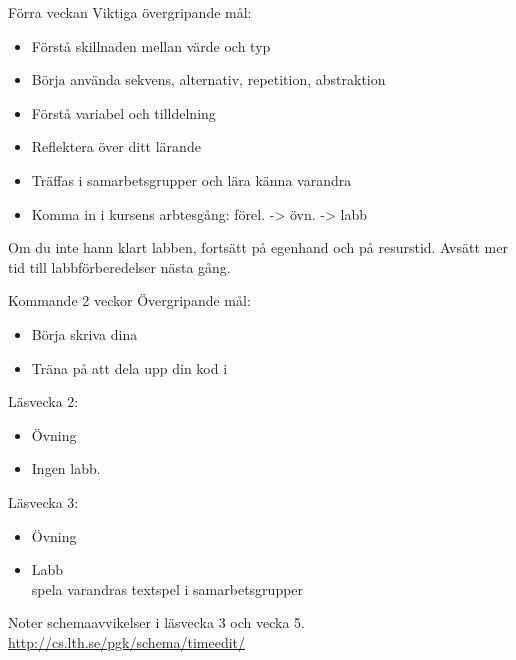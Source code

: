 

\begin{Slide}{Förra veckan}
Viktiga övergripande mål:
\begin{itemize}
\item Förstå skillnaden mellan värde och typ
\item Börja använda sekvens, alternativ, repetition, abstraktion
\item Förstå variabel och tilldelning
\item Reflektera över ditt lärande
\item Träffas i samarbetsgrupper och lära känna varandra
\item Komma in i kursens arbtesgång: förel. -> övn. -> labb
\end{itemize}
Om du inte hann klart labben, fortsätt på egenhand och på resurstid. Avsätt mer tid till labbförberedelser nästa gång.
\end{Slide}


\begin{Slide}{Kommande 2 veckor}
Övergripande mål:
\begin{itemize}
\item Börja skriva dina 
\item Träna på att dela upp din kod i 
\end{itemize}

Läsvecka 2:
\begin{itemize}
\item Övning \texttt{\ExeWeekTWO}
\item Ingen labb.
\end{itemize}
Läsvecka 3:
\begin{itemize}
\item Övning \texttt{\ExeWeekTHREE}
\item Labb \texttt{\LabWeekTHREE}  \\ spela varandras textspel i samarbetsgrupper
\end{itemize}

\vspace{1em} Noter schemaavvikelser i läsvecka 3 och vecka 5.\\\url{http://cs.lth.se/pgk/schema/timeedit/}

\end{Slide}



